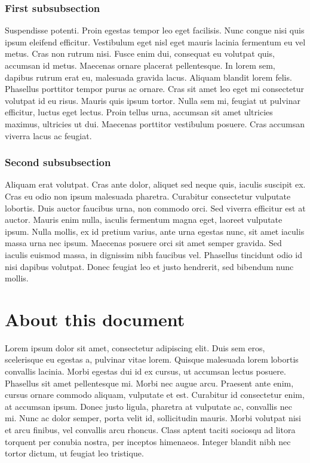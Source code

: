 \documentclass[10pt,a4paper,twoside,twocolumn]{article}
\begin{document}
\subsubsection{First subsubsection}

Suspendisse potenti. Proin egestas tempor leo eget facilisis. Nunc congue nisi quis ipsum eleifend efficitur. Vestibulum eget nisl eget mauris lacinia fermentum eu vel metus. Cras non rutrum nisi. Fusce enim dui, consequat eu volutpat quis, accumsan id metus. Maecenas ornare placerat pellentesque. In lorem sem, dapibus rutrum erat eu, malesuada gravida lacus. Aliquam blandit lorem felis. Phasellus porttitor tempor purus ac ornare. Cras sit amet leo eget mi consectetur volutpat id eu risus. Mauris quis ipsum tortor. Nulla sem mi, feugiat ut pulvinar efficitur, luctus eget lectus. Proin tellus urna, accumsan sit amet ultricies maximus, ultricies ut dui. Maecenas porttitor vestibulum posuere. Cras accumsan viverra lacus ac feugiat.

\subsubsection{Second subsubsection}

Aliquam erat volutpat. Cras ante dolor, aliquet sed neque quis, iaculis suscipit ex. Cras eu odio non ipsum malesuada pharetra. Curabitur consectetur vulputate lobortis. Duis auctor faucibus urna, non commodo orci. Sed viverra efficitur est at auctor. Mauris enim nulla, iaculis fermentum magna eget, laoreet vulputate ipsum. Nulla mollis, ex id pretium varius, ante urna egestas nunc, sit amet iaculis massa urna nec ipsum. Maecenas posuere orci sit amet semper gravida. Sed iaculis euismod massa, in dignissim nibh faucibus vel. Phasellus tincidunt odio id nisi dapibus volutpat. Donec feugiat leo et justo hendrerit, sed bibendum nunc mollis.

\appendix
\section{About this document}

Lorem ipsum dolor sit amet, consectetur adipiscing elit. Duis sem eros, scelerisque eu egestas a, pulvinar vitae lorem. Quisque malesuada lorem lobortis convallis lacinia. Morbi egestas dui id ex cursus, ut accumsan lectus posuere. Phasellus sit amet pellentesque mi. Morbi nec augue arcu. Praesent ante enim, cursus ornare commodo aliquam, vulputate et est. Curabitur id consectetur enim, at accumsan ipsum. Donec justo ligula, pharetra at vulputate ac, convallis nec mi. Nunc ac dolor semper, porta velit id, sollicitudin mauris. Morbi volutpat nisi et arcu finibus, vel convallis arcu rhoncus. Class aptent taciti sociosqu ad litora torquent per conubia nostra, per inceptos himenaeos. Integer blandit nibh nec tortor dictum, ut feugiat leo tristique.


% 
\end{document}
